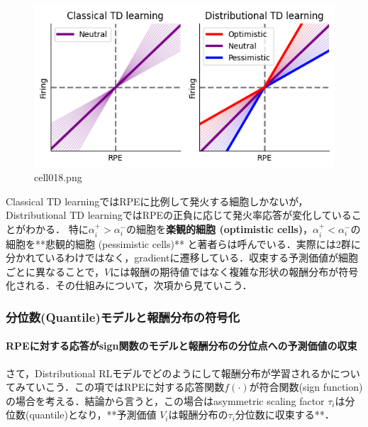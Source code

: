 \begin{figure}[ht]
	\centering
	\includegraphics[scale=0.8, max width=\linewidth]{./fig/bayesian-brain/quantile-expectile-regression/cell018.png}
	\caption{cell018.png}
	\label{cell018.png}
\end{figure}
Classical TD learningではRPEに比例して発火する細胞しかないが，Distributional TD learningではRPEの正負に応じて発火率応答が変化していることがわかる． 特に$\alpha_{i}^{+} \gt \alpha_{i}^{-}$の細胞を\textbf{楽観的細胞 (optimistic cells)}，$\alpha_{i}^{+}\lt
\alpha_{i}^{-}$の細胞を**悲観的細胞 (pessimistic
cells)** と著者らは呼んでいる．実際には2群に分かれているわけではなく，gradientに遷移している．収束する予測価値が細胞ごとに異なることで，$V$には報酬の期待値ではなく複雑な形状の報酬分布が符号化される．その仕組みについて，次項から見ていこう．
\subsubsection{分位数(Quantile)モデルと報酬分布の符号化}
\paragraph{RPEに対する応答がsign関数のモデルと報酬分布の分位点への予測価値の収束}
さて，Distributional RLモデルでどのようにして報酬分布が学習されるかについてみていこう．この項ではRPEに対する応答関数$f(\cdot)$が符合関数(sign function)の場合を考える．結論から言うと，この場合はasymmetric scaling factor $\tau_i$は分位数(quantile)となり，**予測価値
$V_i$は報酬分布の$\tau_i$分位数に収束する**．
    
